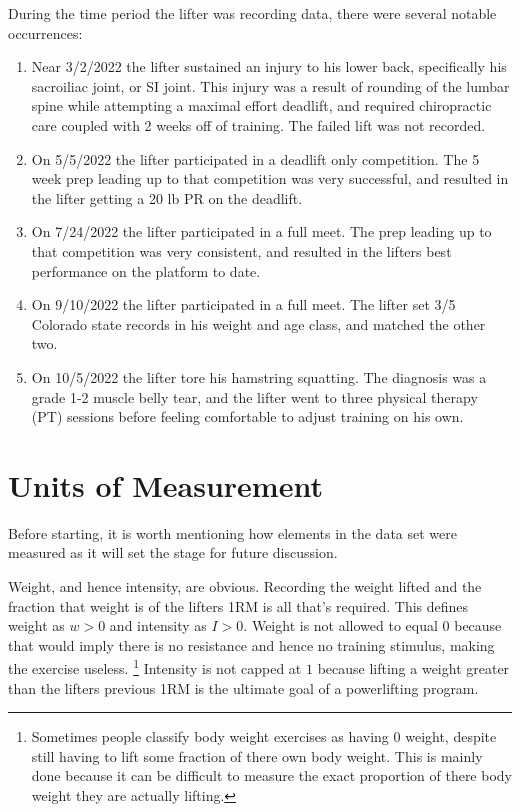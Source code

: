 During the time period the lifter was recording data, there were several notable occurrences:

\begin{enumerate}
    \item Near 3/2/2022 the lifter sustained an injury to his lower back, specifically his sacroiliac joint, or SI joint. This injury was a result of rounding of the lumbar spine while attempting a maximal effort deadlift, and required chiropractic care coupled with 2 weeks off of training. The failed lift was not recorded.
    
    \item On 5/5/2022 the lifter participated in a deadlift only competition. The 5 week prep leading up to that competition was very successful, and resulted in the lifter getting a 20 lb PR on the deadlift.
    
    \item On 7/24/2022 the lifter participated in a full meet. The prep leading up to that competition was very consistent, and resulted in the lifters best performance on the platform to date.
    
   	\item On 9/10/2022 the lifter participated in a full meet. The lifter set 3/5 Colorado state records in his weight and age class, and matched the other two.
    
    \item On 10/5/2022 the lifter tore his hamstring squatting. The diagnosis was a grade 1-2 muscle belly tear, and the lifter went to three physical therapy (PT) sessions before feeling comfortable to adjust training on his own.
\end{enumerate}

\section{Units of Measurement}
\label{sec:UnitsOfMeasurement}

Before starting, it is worth mentioning how elements in the data set were measured as it will set the stage for future discussion.

Weight, and hence intensity, are obvious. Recording the weight lifted and the fraction that weight is of the lifters 1RM is all that's required. This defines weight as $w> 0$ and intensity as $I>0$. Weight is not allowed to equal $0$ because that would imply there is no resistance and hence no training stimulus, making the exercise useless. \footnote{Sometimes people classify body weight exercises as having $0$ weight, despite still having to lift some fraction of there own body weight. This is mainly done because it can be difficult to measure the exact proportion of there body weight they are actually lifting.} Intensity is not capped at $1$ because lifting a weight greater than the lifters previous 1RM is the ultimate goal of a powerlifting program.

